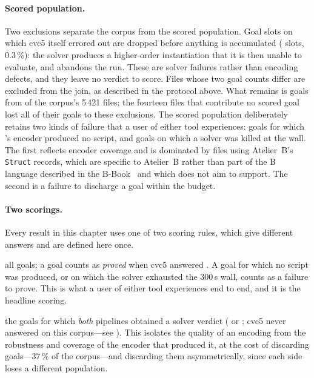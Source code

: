 \paragraph*{Scored population.}
Two exclusions separate the corpus from the scored population.
Goal slots on which cvc5 itself errored out are dropped before anything is accumulated (\bmExcluded{} slots, \(0.3\,\%\)): the solver produces a higher-order instantiation that it is then unable to evaluate, and abandons the run.
These are solver failures rather than encoding defects, and they leave no verdict to score.
Files whose two goal counts differ are excluded from the join, as described in the protocol above.
What remains is \bmGoals{} goals from \bmFiles{} of the corpus's 5\,421 files; the fourteen files that contribute no scored goal lost all of their goals to these exclusions.
The scored population deliberately retains two kinds of failure that a user of either tool experiences: goals for which \beer{}'s encoder produced no script, and goals on which a solver was killed at the wall.
The first reflects encoder coverage and is dominated by files using Atelier~B's \texttt{Struct} records, which are specific to Atelier~B rather than part of the B language described in the B-Book~\cite{abrial1996bbook} and which \beer{} does not aim to support.
The second is a failure to discharge a goal within the budget.

\paragraph*{Two scorings.}
Every result in this chapter uses one of two scoring rules, which give different answers and are defined here once.

\begin{description}[font=\normalfont\itshape]
  \item[strict:] all \bmGoals{} goals; a goal counts as \emph{proved} when cvc5 answered .
    A goal for which no script was produced, or on which the solver exhausted the \(300\)\,s wall, counts as a failure to prove.
    This is what a user of either tool experiences end to end, and it is the headline scoring.
  \item[verdict-only:] the \bmHead{} goals for which \emph{both} pipelines obtained a solver verdict ( or ; cvc5 never answered  on this corpus---see ).
    This isolates the quality of an encoding from the robustness and coverage of the encoder that produced it, at the cost of discarding \bmDropped{} goals---\(37\,\%\) of the corpus---and discarding them asymmetrically, since each side loses a different population.
\end{description}
